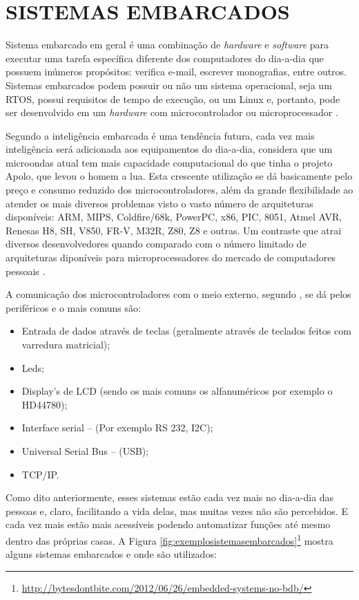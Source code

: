 \chapter{SISTEMAS EMBARCADOS}
Sistema embarcado em geral é uma combinação de \emph{hardware} e \emph{software} para executar uma tarefa específica diferente dos computadores do dia-a-dia que possuem inúmeros propósitos: verifica e-mail, escrever monografias, entre outros. Sistemas embarcados podem possuir ou não um sistema operacional, seja um RTOS, possui requisitos de tempo de execução, ou um Linux e, portanto, pode ser desenvolvido em um \emph{hardware} com microcontrolador ou microprocessador \cite{wikibook2012embedded}.

Segundo \cite{cunha2013} a inteligência embarcada é uma tendência futura, cada vez mais inteligência será adicionada aos equipamentos do dia-a-dia, considera que um microondas atual tem mais capacidade computacional do que tinha o projeto Apolo, que levou o homem a lua. Esta crescente utilização se dá basicamente pelo preço e consumo reduzido dos microcontroladores, além da grande flexibilidade ao atender os mais diversos problemas visto o vasto número de arquiteturas disponíveis: ARM, MIPS, Coldfire/68k, PowerPC, x86, PIC, 8051, Atmel AVR, Renesas H8, SH, V850, FR-V, M32R, Z80, Z8 e outras. Um contraste que atrai diversos desenvolvedores quando comparado com o número limitado de arquiteturas diponíveis para microprocessadores do mercado de computadores pessoais \cite{germano2011}.

A comunicação dos microcontroladores com o meio externo, segundo \cite{germano2011}, se dá pelos periféricos e o mais comuns são:
\begin{itemize}
\item Entrada de dados através de teclas (geralmente através de teclados feitos com varredura matricial);
\item Leds;
\item Display’s de LCD (sendo os mais comuns os alfanuméricos por exemplo o HD44780);
\item Interface serial – (Por exemplo RS 232, I2C);
\item Universal Serial Bus – (USB);
\item TCP/IP.
\end{itemize}

Como dito anteriormente, esses sistemas estão cada vez mais no dia-a-dia das pessoas e, claro, facilitando a vida delas, mas muitas vezes não são percebidos. E cada vez mais estão mais acessíveis podendo automatizar funções até mesmo dentro das próprias casas. A Figura \ref{fig:exemplosistemasembarcados}\footnote{\url{http://bytesdontbite.com/2012/06/26/embedded-systems-no-bdb/}} mostra alguns sistemas embarcados e onde são utilizados:

